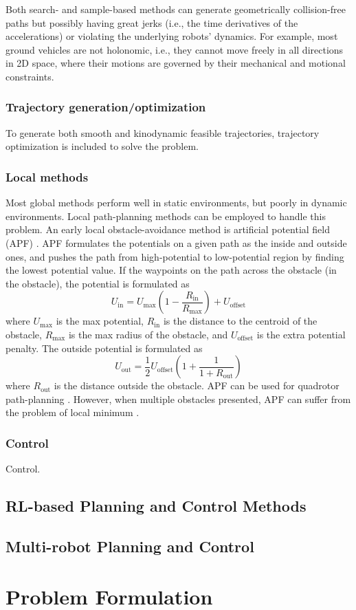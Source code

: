 \documentclass[letterpaper,journal,twoside]{IEEEtran}
\begin{document}
Both search- and sample-based methods can generate geometrically collision-free paths but possibly having great jerks (i.e., the time derivatives of the accelerations) or violating the underlying robots' dynamics.
For example, most ground vehicles are not holonomic, i.e., they cannot move freely in all directions in 2D space, where their motions are governed by their mechanical and motional constraints.

\subsubsection{Trajectory generation/optimization}
To generate both smooth and kinodynamic feasible trajectories, trajectory optimization is included to solve the problem.

\subsubsection{Local methods}
Most global methods perform well in static environments, but poorly in dynamic environments. 
Local path-planning methods can be employed to handle this problem. 
An early local obstacle-avoidance method is artificial potential field (APF) \cite{warren1989global}.
APF formulates the potentials on a given path as the inside and outside ones, and pushes the path from high-potential to low-potential region by finding the lowest potential value. 
If the waypoints on the path across the obstacle (in the obstacle), the potential is formulated as 
\begin{equation}
\label{eq:APF_in}
U_{\text{in}} = 
U_{\text{max}}(1 - \frac{R_{\text{in}}}{R_{\text{max}}}) + 
U_{\text{offset}}
\end{equation}
where $U_{\text{max}}$ is the max potential, $R_{\text{in}}$ is the distance to the centroid of the obstacle, $R_{\text{max}}$ is the max radius of the obstacle, and $U_{\text{offset}}$ is the extra potential penalty.
The outside potential is formulated as 
\begin{equation}
\label{eq:APF_out}
U_{\text{out}} = 
\frac{1}{2}U_{\text{offset}}(1+ \frac{1}{1+R_\text{out}})
\end{equation}
where $R_{\text{out}}$ is the distance outside the obstacle.
APF can be used for quadrotor path-planning \cite{chen2016uav}.
However, when multiple obstacles presented, APF can suffer from the problem of local minimum \cite{koren1991potential}.

\subsubsection{Control}
Control.

\subsection{RL-based Planning and Control Methods}

\subsection{Multi-robot Planning and Control}

\section{Problem Formulation}



\end{document}
